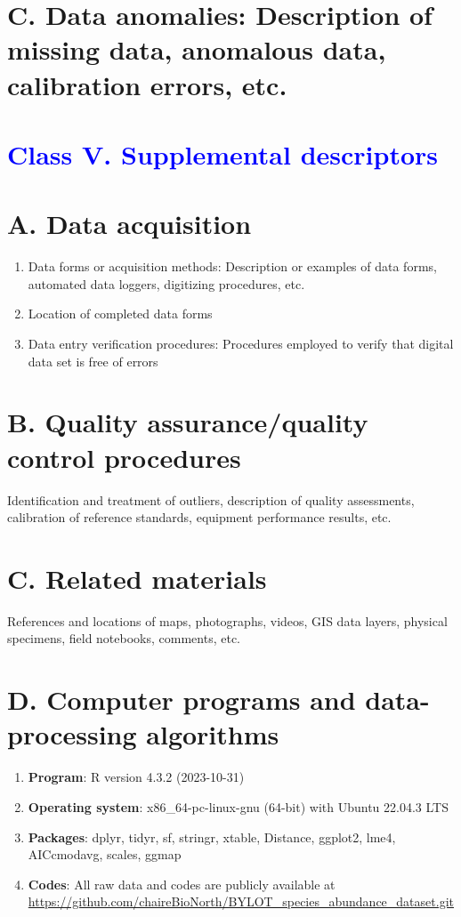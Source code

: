 \documentclass[a4paper,twoside,12pt]{article}
\begin{document}
        
 \section*{C. Data anomalies: Description of missing data, anomalous data, calibration errors, etc.}
 
 \newpage
 
 \section*{\textcolor{Blue}{Class V. Supplemental descriptors}}
    \section*{A. Data acquisition}
    \begin{enumerate}
       \item Data forms or acquisition methods: Description or examples of data forms, automated data loggers, digitizing procedures, etc.
       \item Location of completed data forms
       \item Data entry verification procedures: Procedures employed to verify that digital data set is free of errors
    \end{enumerate}

    \section*{B. Quality assurance/quality control procedures}Identification and treatment of outliers, description of quality assessments, calibration of reference standards, equipment performance results, etc.
    \section*{C. Related materials} References and locations of maps, photographs, videos, GIS data layers, physical specimens, field notebooks, comments, etc.
    \section*{D. Computer programs and data-processing algorithms}
    		\begin{enumerate}
    			\item \textbf{Program}: R version 4.3.2 (2023-10-31)
    			\item \textbf{Operating system}: x86\_64-pc-linux-gnu (64-bit) with Ubuntu 22.04.3 LTS
    			\item \textbf{Packages}: dplyr, tidyr, sf, stringr, xtable, Distance, ggplot2, lme4, AICcmodavg, scales, ggmap
    			\item \textbf{Codes}: All raw data and codes are publicly available at \url{https://github.com/chaireBioNorth/BYLOT_species_abundance_dataset.git}
    		\end{enumerate}
    		
\end{document}
